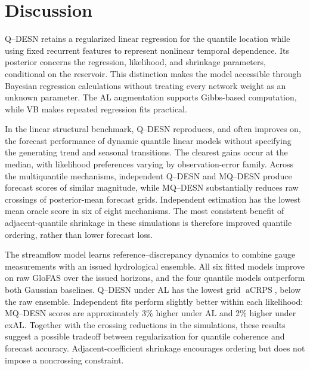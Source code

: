 \documentclass[12pt,letterpaper]{article}
\numberwithin{equation}{section}
\newcommand{\aCRPS}{\operatorname{aCRPS}}
\begin{document}
\begin{table}[!htbp]
\centering
\caption{Electricity-price forecast comparison over the three consecutive
test blocks of 2025. DESN denotes the regional
validation choice among Q--DESN and MQ--DESN under AL and exAL with RHS
priors. PriceFM forecasts are reproduced from the authors' public code.
Scores weight region--fold cases equally; \(\Delta\) is DESN minus PriceFM,
in EUR/MWh.}
\label{tab:pricefm-matched-aql-comparison}

\end{table}

\section{Discussion}
\label{sec:discussion}

Q--DESN retains a regularized linear regression for the quantile location
while using fixed recurrent features to represent nonlinear temporal
dependence. Its posterior concerns the regression, likelihood, and shrinkage
parameters, conditional on the reservoir. This distinction makes the model
accessible through Bayesian regression calculations without treating every
network weight as an unknown parameter. The AL augmentation supports
Gibbs-based computation, while VB makes repeated regression fits practical.

In the linear structural benchmark, Q--DESN reproduces, and often improves
on, the forecast performance of dynamic quantile linear models without
specifying the generating trend and seasonal transitions. The clearest gains
occur at the median, with likelihood preferences varying by observation-error
family. Across the multiquantile mechanisms, independent Q--DESN and
MQ--DESN produce forecast scores of similar magnitude, while MQ--DESN
substantially reduces raw crossings of posterior-mean forecast grids.
Independent estimation has the lowest mean oracle score in six of eight
mechanisms. The most consistent benefit of adjacent-quantile shrinkage in
these simulations is therefore improved quantile ordering, rather than
lower forecast loss.

The streamflow model learns reference--discrepancy dynamics to combine gauge
measurements with an issued hydrological ensemble. All six fitted models
improve on raw GloFAS over the \GlofasApplicationCurrentScoredHorizons{}
issued horizons, and the four quantile models outperform both Gaussian
baselines. Q--DESN under AL has the lowest grid \(\aCRPS\),
\GlofasApplicationCurrentAcrpsReduction{} below the raw ensemble. Independent
fits perform slightly better within each likelihood: MQ--DESN scores are
approximately 3\% higher under AL and 2\% higher under exAL. Together with
the crossing reductions in the simulations, these results suggest a possible
tradeoff between regularization for quantile coherence and forecast accuracy.
Adjacent-coefficient shrinkage encourages ordering but does not impose a
noncrossing constraint.
\end{document}
